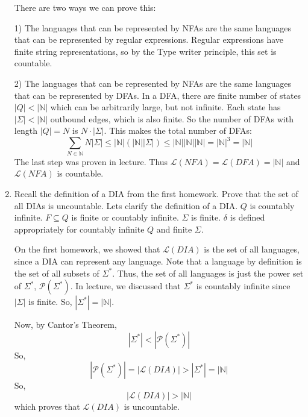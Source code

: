 \documentclass[11pt]{article}
\begin{document}
\begin{enumerate}
    There are two ways we can prove this:

    1) The languages that can be represented by NFAs are the same languages that can be represented by regular expressions. Regular expressions have finite string representations, so by the Type writer principle, this set is countable.

    2) The languages that can be represented by NFAs are the same languages that can be represented by DFAs. In a DFA, there are finite number of states $|Q| < |\mathbb{N}|$ which can be arbitrarily large, but not infinite. Each state has $|\Sigma| < |\mathbb{N}|$ outbound edges, which is also finite. So the number of DFAs with length $|Q| = N$ is $N\cdot|\Sigma|$. This makes the total number of DFAs:
    $$\sum_{N \in \mathbb{N}}N|\Sigma| \leq |\mathbb{N}|(|\mathbb{N}||\Sigma|) \leq |\mathbb{N}||\mathbb{N}||\mathbb{N}| = |\mathbb{N}|^3 = |\mathbb{N}|$$
    The last step was proven in lecture.
    Thus $\mathscr{L}(NFA) = \mathscr{L}(DFA) = |\mathbb{N}|$ and $\mathscr{L}(NFA)$ is countable.

    
    \item Recall the definition of a DIA from the first homework. Prove that the set of all DIAs is uncountable. Lets clarify the definition of a DIA. $Q$ is countably infinite. $F\subseteq Q$ is finite or countably infinite. $\Sigma$ is finite. $\delta$ is defined appropriately for countably infinite $Q$ and finite $\Sigma$. 

    On the first homework, we showed that $\mathscr{L}(DIA)$ is the set of all languages, since a DIA can represent any language. Note that a language by definition is the set of all subsets of $\Sigma^*$. Thus, the set of all languages is just the power set of $\Sigma^*$, $\mathcal{P}(\Sigma^*)$. In lecture, we discussed that $\Sigma^*$ is countably infinite since $|\Sigma|$ is finite. So, $|\Sigma^*| = |\mathbb{N}|$.

    Now, by Cantor's Theorem,
    $$|\Sigma^*| < |\mathcal{P}(\Sigma^*)|$$
    So, 
    $$|\mathcal{P}(\Sigma^*)| = |\mathscr{L}(DIA)| > |\Sigma^*| = |\mathbb{N}|$$
    So,
    $$|\mathscr{L}(DIA)| > |\mathbb{N}|$$
    which proves that $\mathscr{L}(DIA)$ is uncountable.
\end{enumerate} 
\end{document}
